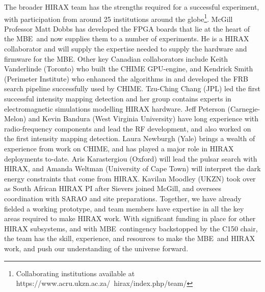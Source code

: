 \documentclass[11pt]{article}
\newcommand{\mbe}{{\rm MBE}}
\begin{document}
The broader HIRAX team has the strengths required for a successful
experiment, with participation from around 25 institutions around the
globe\footnote{Collaborating institutions available at
  https://www.acru.ukzn.ac.za/~hirax/index.php/team/}.  McGill
Professor Matt Dobbs has developed the FPGA boards that lie at the
heart of the \mbe\ and now supplies them to a number of experiments.
He is a HIRAX collaborator and will supply the expertise needed to
supply the hardware and firmware for the \mbe.  Other key Canadian
collaborators include Keith Vanderlinde (Toronto) who built the CHIME
GPU-engine, and Kendrick Smith (Perimeter Institute) who enhanced the
algorithms in \citet{Masui15} and developed the FRB search pipeline
successfully used by CHIME.
Tzu-Ching Chang (JPL) led the first successful intensity
mapping detection \citep{Chang10} and her group contains experts in
electromagnetic simulations modelling HIRAX hardware.  Jeff Peterson
(Carnegie-Melon) and Kevin Bandura (West Virginia University) have
long experience with radio-frequency components and lead the RF
development, and also worked on the first intensity mapping detection.
Laura Newburgh (Yale) brings a wealth of experience from work on
CHIME, and has played a major role in HIRAX deployments to-date.  Aris
Karastergiou (Oxford) will lead the pulsar search with HIRAX, and
Amanda Weltman (University of Cape Town) will interpret the dark
energy constraints that come from HIRAX.  Kavilan Moodley (UKZN) took
over as South African HIRAX PI after Sievers joined McGill, and
oversees coordination with SARAO and site preparations.  Together, we
have already fielded a working prototype, and team members have
expertise in all the key areas required to make HIRAX work.  With
significant funding in place for other HIRAX subsystems, and with
\mbe\ contingency backstopped by the C150 chair, the team has the
skill, experience, and resources to make the \mbe\ and HIRAX work, and
push our understanding of the universe forward.
\end{document}
